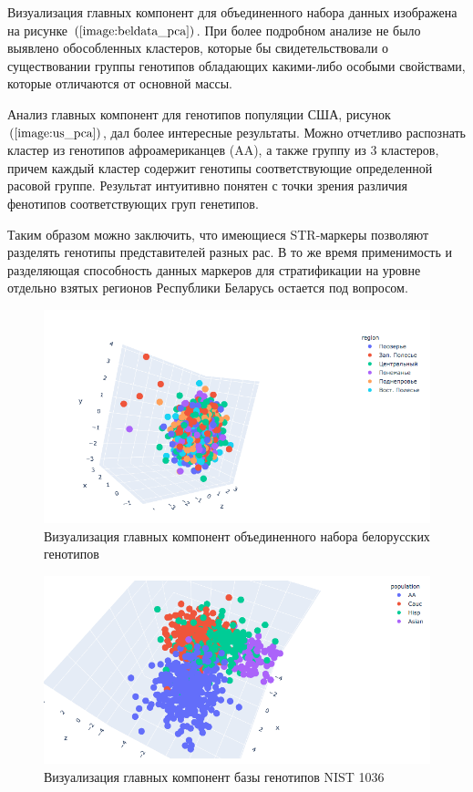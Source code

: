Визуализация главных компонент для объединенного набора данных изображена на рисунке $\left(\ref{image:beldata_pca}\right)$.
При более подробном анализе не было выявлено обособленных кластеров, которые бы свидетельствовали
о существовании группы генотипов обладающих какими-либо особыми свойствами, которые отличаются от основной массы.

Анализ главных компонент для генотипов популяции США, рисунок $\left(\ref{image:us_pca}\right)$,
дал более интересные результаты. Можно отчетливо распознать кластер из генотипов афроамериканцев (AA),
а также группу из 3 кластеров, причем каждый кластер содержит генотипы соответствующие определенной
расовой группе. Результат интуитивно понятен с точки зрения различия фенотипов соответствующих
груп генетипов.

Таким образом можно заключить, что имеющиеся STR-маркеры позволяют разделять
генотипы представителей разных рас. В то же время применимость и разделяющая способность данных маркеров
для стратификации на уровне отдельно взятых регионов Республики Беларусь остается под вопросом.

\begin{figure}[h]
\begin{center}
\includegraphics[width=14cm]{images/beldata_pca.png}
\end{center}
  \caption{Визуализация главных компонент объединенного набора белорусских генотипов}
  \label{image:beldata_pca}
\end{figure}

\begin{figure}[h]
\begin{center}
\includegraphics[width=14cm]{images/us_pca.png}
\end{center}
  \caption{Визуализация главных компонент базы генотипов NIST 1036}
  \label{image:us_pca}
\end{figure}

